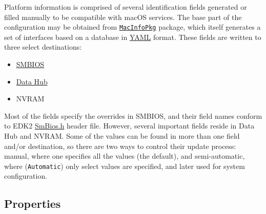 \documentclass[]{article}
\providecommand{\tightlist}{%
  \setlength{\itemsep}{0pt}\setlength{\parskip}{0pt}}
\begin{document}
Platform information is comprised of several identification fields
generated or filled manually to be compatible with macOS services. The
base part of the configuration may be obtained from
\href{https://github.com/acidanthera/MacInfoPkg}{\texttt{MacInfoPkg}}
package, which itself generates a set of interfaces based on a database
in \href{https://yaml.org/spec/1.2/spec.html}{YAML} format. These fields
are written to three select destinations:

\begin{itemize}
\tightlist
\item
  \href{https://www.dmtf.org/standards/smbios}{SMBIOS}
\item
  \href{https://github.com/freebsd/uefi-edk2/blob/master/IntelFrameworkModulePkg/Universal/DataHubDxe/DataHubDxe.uni}{Data
  Hub}
\item
  NVRAM
\end{itemize}

Most of the fields specify the overrides in SMBIOS, and their field
names conform to EDK2
\href{https://github.com/tianocore/edk2/blob/UDK2018/MdePkg/Include/IndustryStandard/SmBios.h}{SmBios.h}
header file. However, several important fields reside in Data Hub and
NVRAM. Some of the values can be found in more than one field and/or
destination, so there are two ways to control their update process:
manual, where one specifies all the values (the default), and semi-automatic,
where (\texttt{Automatic}) only select values are specified, and later used
for system configuration.

\subsection{Properties}\label{platforminfoprops}
\end{document}
